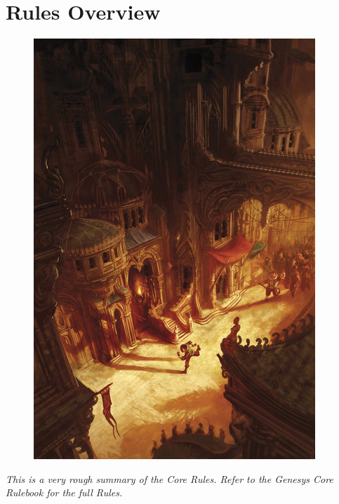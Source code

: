 \chapter{Rules Overview}\label{chap:rules_overview}

\begin{figure}[!htb]
\centering
\includegraphics[width=0.5\linewidth]{images/runner.jpg}
\end{figure}

\begin{centering}
    \textit{This is a very rough summary of the Core Rules. Refer to the Genesys Core Rulebook for the full Rules.}
\end{centering}

